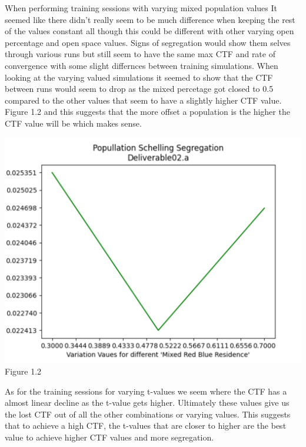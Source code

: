 \documentclass[letterpaper]{article}
\begin{document}
When performing training sessions with varying mixed population values It seemed like there didn't really seem to be much difference when keeping the rest of the values constant all though this could be different with other varying open percentage and open space values.  Signs of segregation would show them selves through various runs but still seem to have the same max CTF and rate of convergence with some slight differnces between training simulations.  When looking at the varying valued simulations it seemed to show that the CTF between runs would seem to drop as the mixed percetage got closed to 0.5 compared to the other values that seem to have a slightly higher CTF value.  Figure 1.2 and this suggests that the more offset a population is the higher the CTF value will be which makes sense.\\ 
\begin{center}
\includegraphics[scale=0.6]{./Images/DeliverableA_Figure1.2}
Figure 1.2
\end{center}
As for the training sessions for varying t-values we seem where the CTF  has a almost linear decline as the t-value gets higher.  Ultimately these values give us the lost CTF out of all the other combinations or varying values. This suggests that to achieve a high CTF, the t-values that are closer to higher are the best value to achieve higher CTF values and more segregation. \\
\end{document}
